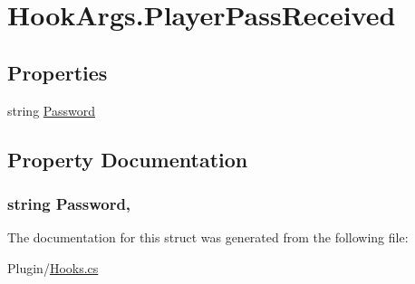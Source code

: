 \hypertarget{structOTA_1_1Plugin_1_1HookArgs_1_1PlayerPassReceived}{}\section{Hook\+Args.\+Player\+Pass\+Received}
\label{structOTA_1_1Plugin_1_1HookArgs_1_1PlayerPassReceived}
\subsection*{Properties}
\begin{DoxyCompactItemize}
\item 
string \hyperlink{structOTA_1_1Plugin_1_1HookArgs_1_1PlayerPassReceived_a9c7aae3a8518d5efd22e991b5944e0d4}{Password}
\end{DoxyCompactItemize}


\subsection{Property Documentation}
\hypertarget{structOTA_1_1Plugin_1_1HookArgs_1_1PlayerPassReceived_a9c7aae3a8518d5efd22e991b5944e0d4}{}
\subsubsection[{Password}]{\setlength{\rightskip}{0pt plus 5cm}string Password\hspace{0.3cm}{\ttfamily [get]}, {\ttfamily [set]}}\label{structOTA_1_1Plugin_1_1HookArgs_1_1PlayerPassReceived_a9c7aae3a8518d5efd22e991b5944e0d4}


The documentation for this struct was generated from the following file\+:\begin{DoxyCompactItemize}
\item 
Plugin/\hyperlink{Hooks_8cs}{Hooks.\+cs}\end{DoxyCompactItemize}
